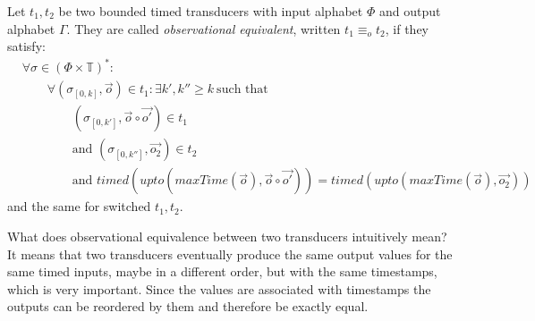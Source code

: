 \begin{definition}[name = Observational Equivalence]\label{def:observational_equivalence}
  Let \(t_1, t_2\) be two bounded timed transducers with input alphabet \(\Phi\) and output alphabet \(\Gamma\).
  They are called \emph{observational equivalent}, written \(t_1 \equiv_o t_2\), if they satisfy:
  \begin{align*}
    &\forall \sigma \in {(\Phi\times\mathbb{T})}^*:\\
    &\hspace{2em}\forall (\sigma_{[0,k]}, \vec{o}) \in t_1: \exists k', k'' \geq k\ \text{such that}\\
    &\hspace{4em}(\sigma_{[0,k']}, \vec{o} \circ \vec{o'}) \in t_1\\
    &\hspace{4em}\text{and } (\sigma_{[0,k'']}, \vec{o_2}) \in t_2\\
    &\hspace{4em}\text{and } \mathit{timed}(\mathit{upto}(\mathit{maxTime}(\vec{o}),\vec{o} \circ \vec{o'} )) = \mathit{timed}(\mathit{upto}(\mathit{maxTime}(\vec{o}),\vec{o_2}))
  \end{align*}
  and the same for switched \(t_1, t_2\).
\end{definition}

What does observational equivalence between two transducers intuitively mean?
It means that two transducers eventually produce the same output values for the same timed inputs, maybe in a different order, but with the same timestamps, which is very important.
Since the values are associated with timestamps the outputs can be reordered by them and therefore be exactly equal.

